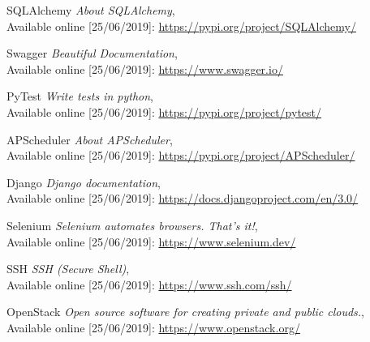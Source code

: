 \begin{thebibliography}{9}
    SQLAlchemy
    \textit{About SQLAlchemy}, \\
    Available online [25/06/2019]:
    \url{https://pypi.org/project/SQLAlchemy/} \\
    \vspace{-0.5cm}

    Swagger
    \textit{Beautiful Documentation}, \\
    Available online [25/06/2019]:
    \url{https://www.swagger.io/} \\
    \vspace{-0.5cm}

    PyTest
    \textit{Write tests in python}, \\
    Available online [25/06/2019]:
    \url{https://pypi.org/project/pytest/} \\
    \vspace{-0.5cm}

    APScheduler
    \textit{About APScheduler}, \\
    Available online [25/06/2019]:
    \url{https://pypi.org/project/APScheduler/} \\
    \vspace{-0.5cm}
    
    Django
    \textit{Django documentation}, \\
    Available online [25/06/2019]:
    \url{https://docs.djangoproject.com/en/3.0/} \\
    \vspace{-0.5cm}

    Selenium
    \textit{Selenium automates browsers. That's it!}, \\
    Available online [25/06/2019]:
    \url{https://www.selenium.dev/} \\
    \vspace{-0.5cm}
    
    SSH
    \textit{SSH (Secure Shell)}, \\
    Available online [25/06/2019]:
    \url{https://www.ssh.com/ssh/} \\
    \vspace{-0.5cm}
       
    OpenStack
    \textit{Open source software for creating private and public clouds.}, \\
    Available online [25/06/2019]:
    \url{https://www.openstack.org/} \\
    \vspace{-0.5cm}
        

\end{thebibliography}
